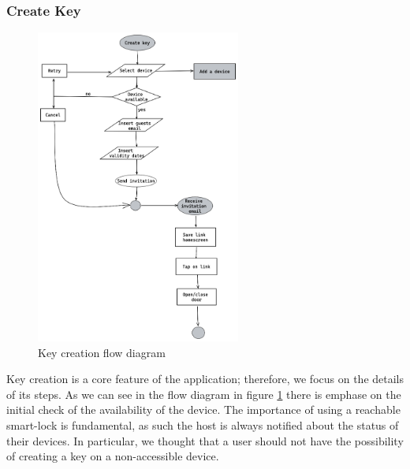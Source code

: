 \subsubsection{Create Key}
\begin{figure}[ht]
    \centering
    \includegraphics[width=0.6\textwidth]{figures/keyflow.excalidraw.png}
    \caption{Key creation flow diagram}
    \label{fig:keyflow}
\end{figure}
Key creation is a core feature of the application; therefore, we focus on the details of its steps. As we can see in the flow diagram in figure \ref{fig:keyflow} there is emphase on the initial check of the availability of the device. The importance of using a reachable smart-lock is fundamental, as such the host is always notified about the status of their devices.
In particular, we thought that a user should not have the possibility of creating a key on a non-accessible device.

